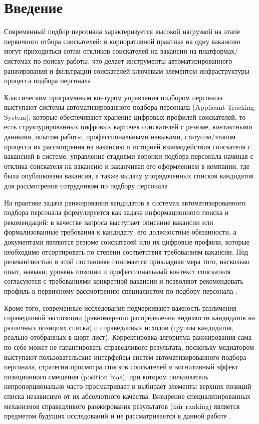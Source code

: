 \chapter*{Введение}
\label{sec:intro}
Современный подбор персонала характеризуется высокой нагрузкой на этапе первичного отбора соискателей: в корпоративной практике на одну вакансию могут приходиться сотни откликов соискателей на вакансии на платформах/системах по поиску работы, что делает инструменты автоматизированного ранжирования и фильтрации соискателей ключевым элементом инфраструктуры процесса подбора персонала \cite{src02}.\par
Классическим программным контуром управления подбором персонала выступают системы автоматизированного подбора персонала (Applicant Tracking System), которые обеспечивают хранение цифровых профилей соискателей, то есть структурированных цифровых карточек соискателей с резюме, контактными данными, опытом работы, профессиональными навыками, статусом/этапом процесса их рассмотрения на вакансию и историей взаимодействия соискателя с вакансией в системе, управление стадиями воронки подбора персонала начиная с отклика соискателя на вакансию и заканчивая его оформлением в компании, где была опубликована вакансия, а также выдачу упорядоченных списков кандидатов для рассмотрения сотрудником по подбору персонала \cite{src02}.\par
На практике задача ранжирования кандидатов в системах автоматизированного подбора персонала формулируется как задача информационного поиска и рекомендаций: в качестве запроса выступает описание вакансии или формализованные требования к кандидату, его должностные обязанности, а документами являются резюме соискателей или их цифровые профили, которые необходимо отсортировать по степени соответствия требованиям вакансии. Под релевантностью в этой постановке понимается прикладная мера того, насколько опыт, навыки, уровень позиции и профессиональный контекст соискателя согласуются с требованиями конкретной вакансии и позволяют рекомендовать профиль к первичному рассмотрению специалистом по подбору персонала \cite{src02, src03}.\par
Кроме того, современные исследования подчеркивают важность различения справедливой экспозиции (равномерного распределения видимости кандидатов на различных позициях списка) и справедливых исходов (группы кандидатов, реально отобранных в шорт-лист). Корректировка алгоритма ранжирования сама по себе может не гарантировать справедливого результата, поскольку медиатором выступают пользовательские интерфейсы систем автоматизированного подбора персонала, стратегии просмотра списков соискателей и когнитивный эффект позиционного смещения (position bias), при котором пользователь непропорционально часто просматривает и выбирает элементы верхних позиций списка независимо от их абсолютного качества. Внедрение специализированных механизмов справедливого ранжирования результатов (fair ranking) является предметом будущих исследований и не рассматривается в данной работе \cite{src02}.\par
